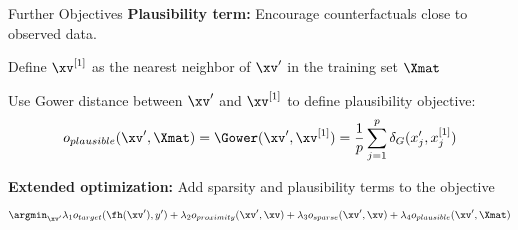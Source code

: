 \documentclass[10pt,compress,t,notes=noshow, xcolor=table]{beamer}
\begin{document}
\begin{framev}[align=top]{Further Objectives}
\textbf{Plausibility term:} Encourage counterfactuals close to observed data.
\begin{itemizeM}
\item Define $\xv^{[1]}$ as the nearest neighbor of $\xv'$ in the training set $\Xmat$
\item Use Gower distance between $\xv'$ and $\xv^{[1]}$ to define plausibility objective:
$$
o_{plausible}(\xv', \Xmat) = \Gower(\xv', \xv^{[1]}) = \frac{1}{p} \sum_{j = 1}^{p} \delta_G(x_j', x^{[1]}_j)
$$
\end{itemizeM}
\pause
\spacer[0.25]
\textbf{Extended optimization:} Add sparsity and plausibility terms to the objective
$$
\argmin_{\xv'} \lambda_1 o_{target}(\fh(\xv'), y')
+ \lambda_2 o_{proximity}(\xv', \xv)
+ \lambda_3 o_{sparse}(\xv', \xv)
+ \lambda_4 o_{plausible}(\xv', \Xmat)
$$
\end{framev}
\end{document}
